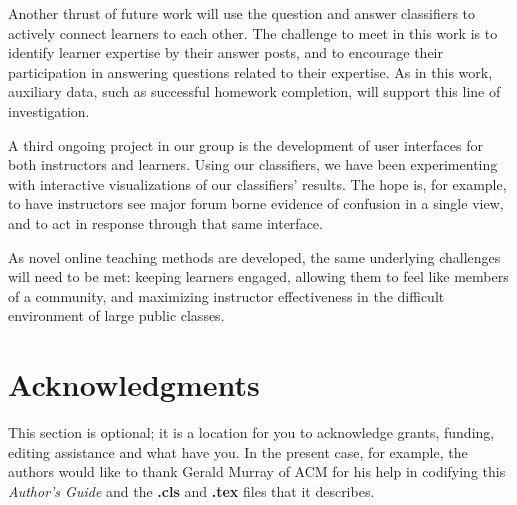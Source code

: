 \documentclass{edm_template}
\begin{document}
Another thrust of future work will use the question and answer
classifiers to actively connect learners to each other. The challenge
to meet in this work is to identify learner expertise by their answer
posts, and to encourage their participation in answering questions
related to their expertise. As in this work, auxiliary data, such as
successful homework completion, will support this line of
investigation.

A third ongoing project in our group is the development of user
interfaces for both instructors and learners. Using our classifiers,
we have been experimenting with interactive visualizations of our
classifiers' results. The hope is, for example, to have instructors
see major forum borne evidence of confusion in a single view, and to
act in response through that same interface.

As novel online teaching methods are developed, the same underlying
challenges will need to be met: keeping learners engaged, allowing
them to feel like members of a community, and maximizing instructor
effectiveness in the difficult environment of large public classes.


\section{Acknowledgments}
This section is optional\cite{wen2014sentiment}; it is a location for you
to acknowledge grants, funding, editing assistance and
what have you.  In the present case, for example, the
authors would like to thank Gerald Murray of ACM for
his help in codifying this \textit{Author's Guide}
and the \textbf{.cls} and \textbf{.tex} files that it describes.

%

%
%
\balancecolumns
\end{document}
